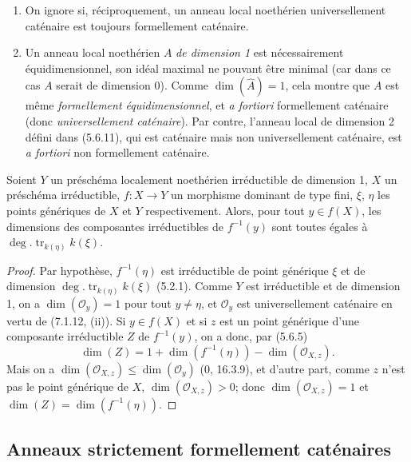 \begin{remarks}[7.1.12]
\label{IV.2.s7.1.12-fr}
\begin{enumerate}
\item[(i)] On ignore si, réciproquement, un anneau local noethérien
universellement caténaire est toujours formellement caténaire.
\item[(ii)] Un anneau local noethérien $A$ \emph{de dimension 1} est nécessairement
équidimensionnel, son idéal maximal ne pouvant être minimal (car dans ce
cas $A$ serait de dimension 0). Comme $\dim(\widehat A)=1$, cela montre que
$A$ est même \emph{formellement équidimensionnel}, et \emph{a fortiori}
formellement caténaire (donc \emph{universellement caténaire}). Par contre,
l'anneau local de dimension 2 défini dans (5.6.11), qui est caténaire mais
non universellement caténaire, est \emph{a fortiori} non formellement
caténaire.
\end{enumerate}
\end{remarks}


\begin{corollary}[7.1.13]
\label{IV.2.s7.1.13-fr}
Soient $Y$ un préschéma localement noethérien irréductible de dimension 1,
$X$ un préschéma irréductible, $f:X\to Y$ un morphisme dominant de type
fini, $\xi$, $\eta$ les points génériques de $X$ et $Y$ respectivement.
Alors, pour tout $y\in f(X)$, les dimensions des composantes irréductibles
de $f^{-1}(y)$ sont toutes égales à
$\deg.\operatorname{tr}_{k(\eta)}k(\xi)$.
\end{corollary}

\begin{proof}
Par hypothèse, $f^{-1}(\eta)$ est irréductible de point générique $\xi$ et
de dimension $\deg.\operatorname{tr}_{k(\eta)}k(\xi)$ (5.2.1). Comme $Y$
est irréductible et de dimension 1, on a $\dim(\mathscr O_y)=1$ pour tout
$y\neq\eta$, et $\mathscr O_y$ est universellement caténaire en vertu de
(7.1.12, (ii)). Si $y\in f(X)$ et si $z$ est un point générique d'une
composante irréductible $Z$ de $f^{-1}(y)$, on a donc, par (5.6.5)
\[
\dim(Z)=1+\dim(f^{-1}(\eta))-\dim(\mathscr O_{X,z}).
\]
Mais on a $\dim(\mathscr O_{X,z})\leqslant\dim(\mathscr O_y)$ (0,
16.3.9), et d'autre part, comme $z$ n'est pas le point générique de $X$,
$\dim(\mathscr O_{X,z})>0$; donc $\dim(\mathscr O_{X,z})=1$ et
$\dim(Z)=\dim(f^{-1}(\eta))$.
\end{proof}

\subsection{Anneaux strictement formellement caténaires}
\label{subsection:IV.7.2-fr}

